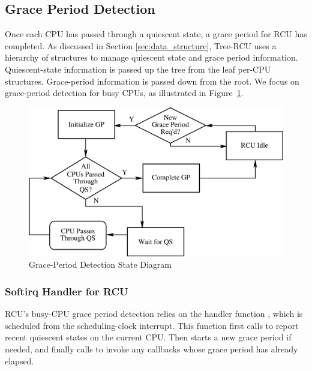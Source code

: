 \subsection{Grace Period Detection} \label{sec:grace_period}
Once each CPU has passed through a quiescent state, a grace period for RCU
has completed. 
As discussed in Section \ref{sec:data_structure}, Tree-RCU uses a hierarchy 
of  structures to manage quiescent state and grace period
information.
Quiescent-state information is passed up the 
tree from the leaf per-CPU  structures.
Grace-period information is passed down from the root.
%
We focus on grace-period detection for busy CPUs, as illustrated
in Figure~\ref{fig:grace_period_state_diagram}.

\begin{figure}[tb]
\centering
\includegraphics[scale=0.25]{grace_period_state_diagram.pdf}
\caption{Grace-Period Detection State Diagram}
\label{fig:grace_period_state_diagram}
\end{figure}

\subsubsection{Softirq Handler for RCU} \label{sec:rcu_softirq}
RCU's busy-CPU grace period detection relies on the
 handler function ,
which is scheduled from the scheduling-clock interrupt.
This function first calls
 to report recent quiescent states
on the current CPU.
Then  starts a new grace period if needed,
and finally calls  to invoke any callbacks
whose grace period has already elapsed.

